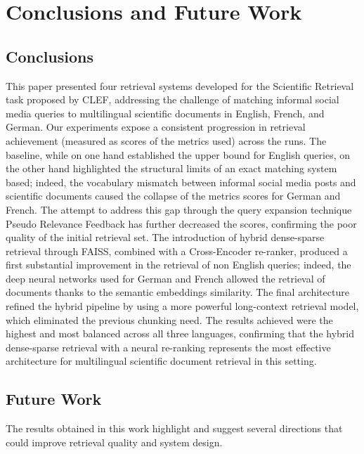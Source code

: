 \section{Conclusions and Future Work}
\label{sec:conclusion}

\subsection{Conclusions}

This paper presented four retrieval systems developed for the Scientific Retrieval task proposed by CLEF, addressing the challenge of matching informal social media queries to multilingual scientific documents in English, French, and German.
\noindent Our experiments expose a consistent progression in retrieval achievement (measured as scores of the metrics used) across the runs. The baseline, while on one hand established the upper bound for English queries, on the other hand highlighted the structural limits of an exact matching system based; indeed, the vocabulary mismatch between informal social media posts and scientific documents caused the collapse of the metrics scores for German and French.  The attempt to address this gap through the query expansion technique Pseudo Relevance Feedback has further decreased the scores, confirming the poor quality of the initial retrieval set. The introduction of hybrid dense-sparse retrieval through FAISS, combined with a Cross-Encoder re-ranker, produced a first substantial improvement in the retrieval of non English queries; indeed, the deep neural networks used for German and French allowed the retrieval of documents thanks to the semantic embeddings similarity. 
\noindent The final architecture refined the hybrid pipeline by using a more powerful long-context retrieval model, which eliminated the previous chunking need. The results achieved were the highest and most balanced across all three languages, confirming that the hybrid dense-sparse retrieval with a neural re-ranking represents the most effective architecture for multilingual scientific document retrieval in this setting.

\subsection{Future Work}
\label{sec:future_work}

The results obtained in this work highlight and suggest several directions that could improve retrieval quality and system design.


